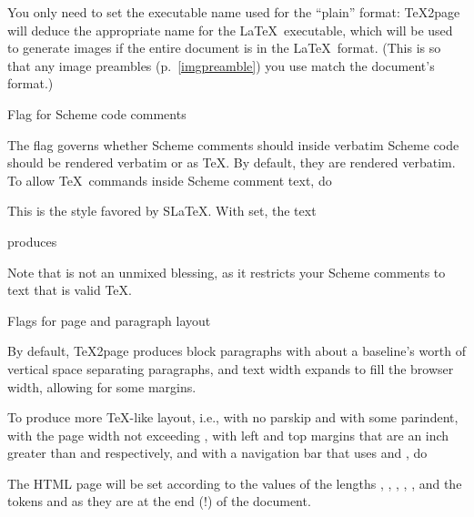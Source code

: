 
You only need to set the executable name used for the “plain” format:
\TeX2page will deduce the appropriate name for the \LaTeX\ executable,
which will be used to generate images if the entire document is in the
\LaTeX\ format.  (This is so that any image preambles
(p.~\ref{imgpreamble}) you use match the
document’s format.)

\beginsection Flag for Scheme code comments

The flag \p{\TZPslatexcomments} governs whether Scheme comments
should inside verbatim Scheme code should be rendered verbatim or as \TeX.
By default, they are rendered verbatim.   To allow \TeX\ commands inside
Scheme comment text, do


\n This is the style favored by S\LaTeX.
\ifx\shipout\UnDeFiNeD
With \p{\TZPslatexcomments} set, the text


\n produces
\let\TZPslatexcomments 1

\let\TZPslatexcomments 0

\fi
Note that \p{\TZPslatexcomments=1} is not an unmixed blessing, as it
restricts your Scheme comments to text that is valid \TeX.

\beginsection Flags for page and paragraph layout

%
By default, \TeX2page produces block paragraphs with about a
baseline’s worth of vertical space separating paragraphs, and text width
expands to fill the browser width, allowing for some margins.

To produce more \TeX-like layout, i.e., with no parskip and
with some parindent,
with the page width not exceeding \p{\hsize},
with left and top margins that are an inch greater than
\p{\hoffset} and \p{\voffset} respectively, and with a
navigation bar that uses \p{\headline} and \p{\footline},
do


%
The HTML page will be set according to the values of the
lengths \p{\hsize}, \p{\hoffset}, \p{\voffset},
\p{\parskip}, \p{\parindent}, and the tokens \p{\headline}
and \p{\footline} as they are at the end (!) of
the document.

